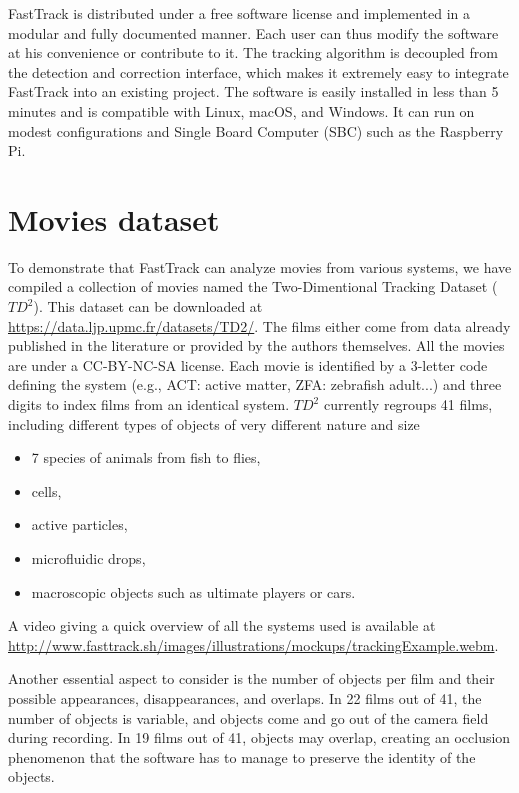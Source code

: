     FastTrack is distributed under a free software license and implemented in a modular and fully documented manner. Each user can thus modify the software at his convenience or contribute to it. The tracking algorithm is decoupled from the detection and correction interface, which makes it extremely easy to integrate FastTrack into an existing project. The software is easily installed in less than 5 minutes and is compatible with Linux, macOS, and Windows. It can run on modest configurations and Single Board Computer (SBC) such as the Raspberry Pi.


\chapter{Movies dataset}
    To demonstrate that FastTrack can analyze movies from various systems, we have compiled a collection of movies named the Two-Dimentional Tracking Dataset ($TD^2$). This dataset can be downloaded at \url{https://data.ljp.upmc.fr/datasets/TD2/}. The films either come from data already published in the literature or provided by the authors themselves. All the movies are under a CC-BY-NC-SA license. Each movie is identified by a 3-letter code defining the system (e.g., ACT: active matter, ZFA: zebrafish adult...) and three digits to index films from an identical system. $TD^2$ currently regroups 41 films, including different types of objects of very different nature and size
    \begin{itemize}
    \item 7 species of animals from fish to flies,
    \item cells,
    \item active particles,
    \item microfluidic drops,
    \item macroscopic objects such as ultimate players or cars.
    \end{itemize}
    A video giving a quick overview of all the systems used is available at \url{http://www.fasttrack.sh/images/illustrations/mockups/trackingExample.webm}.

    Another essential aspect to consider is the number of objects per film and their possible appearances, disappearances, and overlaps. In 22 films out of 41, the number of objects is variable, and objects come and go out of the camera field during recording. In 19 films out of 41, objects may overlap, creating an occlusion phenomenon that the software has to manage to preserve the identity of the objects.

